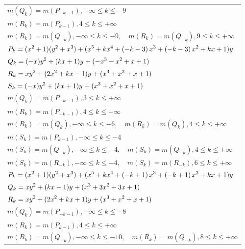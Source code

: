 \documentclass{amsart}
\begin{document}
\begin{longtable}{|l|}
\(\displaystyle m(Q_k) = m(P_{-k
 - 1}),-\infty \leqslant k \leqslant -9\)\\
\(\displaystyle m(R_k) = m(P_{k
 - 1}),4 \leqslant k \leqslant +\infty\)\\
\(\displaystyle m(R_k) = m(Q_{-k}),-\infty \leqslant k \leqslant -9,\quad m(R_k) = m(Q_{-k}),9 \leqslant k \leqslant +\infty\)\\
\hline
\(\displaystyle P_k=(x^2
 + 1)(y^2+x^3)+(x^5
 + k\*x^4
 + \left(-k
 - 3\right) \*x^3
 + \left(-k
 - 3\right) \*x^2
 + k\*x
 + 1)y\)\\
\(\displaystyle Q_k=(-x)y^{2}+(k\*x
 + 1)y^{}+(-x^3
 - x^2
 + x
 + 1)\)\\
\(\displaystyle R_k=xy^{2}+(2\*x^2
 + k\*x
 - 1)y^{}+(x^3
 + x^2
 + x
 + 1)\)\\
\(\displaystyle S_k=(-x)y^{2}+(k\*x
 + 1)y^{}+(x^3
 + x^2
 + x
 + 1)\)\\
\(\displaystyle m(Q_k) = m(P_{-k
 - 1}),3 \leqslant k \leqslant +\infty\)\\
\(\displaystyle m(R_k) = m(P_{-k
 - 1}),4 \leqslant k \leqslant +\infty\)\\
\(\displaystyle m(R_k) = m(Q_{k}),-\infty \leqslant k \leqslant -6,\quad m(R_k) = m(Q_{k}),4 \leqslant k \leqslant +\infty\)\\
\(\displaystyle m(S_k) = m(P_{k
 - 1}),-\infty \leqslant k \leqslant -4\)\\
\(\displaystyle m(S_k) = m(Q_{-k}),-\infty \leqslant k \leqslant -4,\quad m(S_k) = m(Q_{-k}),4 \leqslant k \leqslant +\infty\)\\
\(\displaystyle m(S_k) = m(R_{-k}),-\infty \leqslant k \leqslant -4,\quad m(S_k) = m(R_{-k}),6 \leqslant k \leqslant +\infty\)\\
\hline
\(\displaystyle P_k=(x^2
 + 1)(y^2+x^3)+(x^5
 + k\*x^4
 + \left(-k
 + 1\right) \*x^3
 + \left(-k
 + 1\right) \*x^2
 + k\*x
 + 1)y\)\\
\(\displaystyle Q_k=xy^{2}+(k\*x
 - 1)y^{}+(x^3
 + 3\*x^2
 + 3\*x
 + 1)\)\\
\(\displaystyle R_k=xy^{2}+(2\*x^2
 + k\*x
 + 1)y^{}+(x^3
 + x^2
 + x
 + 1)\)\\
\(\displaystyle m(Q_k) = m(P_{-k
 - 1}),-\infty \leqslant k \leqslant -8\)\\
\(\displaystyle m(R_k) = m(P_{k
 - 1}),4 \leqslant k \leqslant +\infty\)\\
\(\displaystyle m(R_k) = m(Q_{-k}),-\infty \leqslant k \leqslant -10,\quad m(R_k) = m(Q_{-k}),8 \leqslant k \leqslant +\infty\)\\

\end{longtable}
\end{document}
